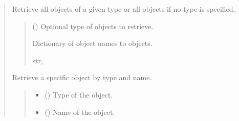 \documentclass[letterpaper,10pt,english]{sphinxmanual}
\begin{document}
\begin{quote}
\begin{fulllineitems}
\begin{fulllineitems}
\label{\detokenize{pygeox:pygeox.geoscene.GeoScene.get_all_objects}}
\pysigstartsignatures
\pysiglinewithargsret
{}
{}
{}
\pysigstopsignatures
\sphinxAtStartPar
Retrieve all objects of a given type or all objects if no type is specified.
\begin{quote}\begin{description}
\sphinxAtStartPar
{} (\sphinxstyleliteralemphasis{\sphinxupquote{ | }}) \textendash{} Optional type of objects to retrieve.

\sphinxAtStartPar
Dictionary of object names to objects.

\sphinxAtStartPar
\sphinxstyleemphasis{Dict}{[}str, \sphinxstyleemphasis{Any}{]}

\end{description}\end{quote}

\end{fulllineitems}


\begin{fulllineitems}
\label{\detokenize{pygeox:pygeox.geoscene.GeoScene.get_object}}
\pysigstartsignatures
\pysiglinewithargsret
{}
{\sphinxparamcomma {}}
{}
\pysigstopsignatures
\sphinxAtStartPar
Retrieve a specific object by type and name.
\begin{quote}\begin{description}
\begin{itemize}
\item {} 
\sphinxAtStartPar
{} () \textendash{} Type of the object.

\item {} 
\sphinxAtStartPar
{} () \textendash{} Name of the object.


\end{itemize}
\end{description}
\end{quote}
\end{fulllineitems}
\end{fulllineitems}
\end{quote}
\end{document}
